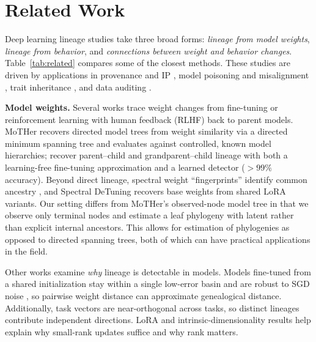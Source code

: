 \documentclass{article}
\theoremstyle{definition}
\theoremstyle{plain}
\begin{document}
\section{Related Work}
\label{sec:related}

Deep learning lineage studies take three broad forms: \emph{lineage from model weights}, \emph{lineage from behavior}, and \emph{connections between weight and behavior changes}. Table~\ref{tab:related} compares some of the closest methods. These studies are driven by applications in provenance and IP
\citep{horwitz2025mother, zeng2024huref, nikolic2026model}, model poisoning and misalignment
\citep{cloud2025subliminal}, trait inheritance \citep{cloud2025subliminal, agents2026same}, and data
auditing \citep{zhu2025independence}.

\textbf{Model weights.} Several works trace weight changes from fine-tuning or reinforcement learning with human feedback (RLHF) back to parent models. MoTHer
\citep{horwitz2025mother} recovers directed model trees from weight similarity via a directed minimum
spanning tree and evaluates against controlled, known model hierarchies; \citet{yu2025neural} recover parent--child and grandparent--child lineage with both a
learning-free fine-tuning approximation and a learned detector ($>99\%$ accuracy). Beyond direct
lineage, spectral weight ``fingerprints'' identify common ancestry \citep{ghostspec2025}, and Spectral
DeTuning \citep{horwitz2024spectral} recovers base weights from shared LoRA variants. Our setting
differs from MoTHer's observed-node model tree in that we observe only terminal nodes and estimate a
leaf phylogeny with latent rather than explicit internal ancestors.  This allows for estimation of phylogenies as opposed to directed spanning trees, both of which can have practical applications in the field.

Other works examine \emph{why} lineage is detectable in models. Models fine-tuned from a shared initialization stay
within a single low-error basin and are robust to SGD noise
\citep{neyshabur2020,wortsman2022model,frankle2020linear}, so pairwise weight distance can approximate genealogical distance. Additionally, task vectors \citep{ilharco2023editing} are near-orthogonal across tasks, so
distinct lineages contribute independent directions. LoRA \citep{hu2022lora} and intrinsic-dimensionality
results \citep{aghajanyan2021intrinsic} help explain why small-rank updates suffice and why rank matters.
\end{document}
